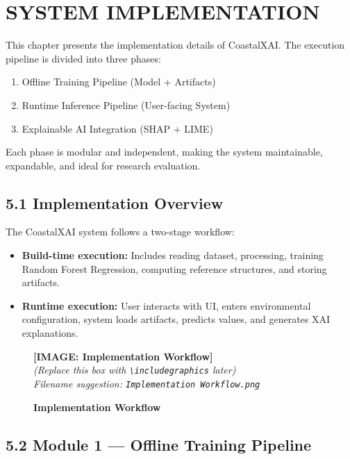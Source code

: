 \documentclass[12pt, a4paper]{article}
\newcommand{\imageplaceholder}[2]{
  \begin{figure}[H]
    \centering
    \begin{tcolorbox}[colback=white, colframe=black, width=0.8\textwidth, arc=0mm, boxrule=1pt]
      \centering
      \vspace{#2}
      \textbf{\Large [IMAGE: #1]}\\
      \vspace{0.5cm}
      \textit{(Replace this box with \texttt{\textbackslash includegraphics} later)}\\
      \textit{Filename suggestion: \texttt{#1.png}}
      \vspace{#2}
    \end{tcolorbox}
    \caption{\textbf{#1}}
    \label{fig:#1}
  \end{figure}
}
\begin{document}
\newpage
\section{\textbf{SYSTEM IMPLEMENTATION}}

This chapter presents the implementation details of CoastalXAI. The execution pipeline is divided into three phases:

\begin{enumerate}
    \item Offline Training Pipeline (Model + Artifacts)
    \item Runtime Inference Pipeline (User-facing System)
    \item Explainable AI Integration (SHAP + LIME)
\end{enumerate}

Each phase is modular and independent, making the system maintainable, expandable, and ideal for research evaluation.


\subsection{\textbf{5.1 Implementation Overview}}

The CoastalXAI system follows a two-stage workflow:

\begin{itemize}
    \item \textbf{Build-time execution:}  
    Includes reading dataset, processing, training Random Forest Regression, computing reference structures, and storing artifacts.

    \item \textbf{Runtime execution:}  
    User interacts with UI, enters environmental configuration, system loads artifacts, predicts values, and generates XAI explanations.
\end{itemize}

\imageplaceholder{Implementation Workflow}{5cm}



\subsection{\textbf{5.2 Module 1 — Offline Training Pipeline}}
\end{document}
